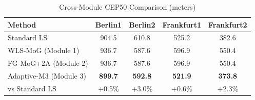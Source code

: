 \begin{table}[t]
\centering
\caption{Cross-Module CEP50 Comparison (meters)}
\label{tab:cross_module}
\begin{tabular}{lcccc}
\toprule
\textbf{Method} & \textbf{Berlin1} & \textbf{Berlin2} & \textbf{Frankfurt1} & \textbf{Frankfurt2} \\
\midrule
Standard LS & 904.5 & 610.8 & 525.2 & 382.6 \\
WLS-MoG (Module 1) & 936.7 & 587.6 & 596.9 & 550.4 \\
FG-MoG+2A (Module 2) & 936.7 & 587.6 & 596.9 & 550.4 \\
Adaptive-M3 (Module 3) & \textbf{899.7} & \textbf{592.8} & \textbf{521.9} & \textbf{373.8} \\
\midrule
vs Standard LS & +0.5\% & +3.0\% & +0.6\% & +2.3\% \\
\bottomrule
\end{tabular}
\end{table}
